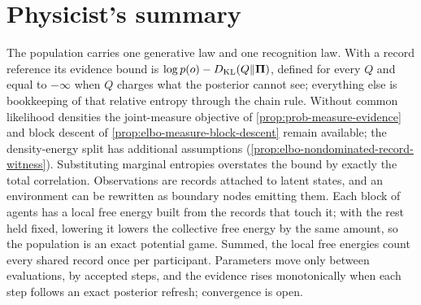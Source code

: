 \section*{Physicist's summary}

The population carries one generative law and one recognition law. With a
record reference its evidence bound is $\log p(o)-D_{\mathrm{KL}}(Q\Vert\boldsymbol\Pi)$, defined for every
$Q$ and equal to $-\infty$ when $Q$ charges what the posterior cannot see;
everything else is bookkeeping of that relative entropy through the chain rule.
Without common likelihood densities the joint-measure objective of
\cref{prop:prob-measure-evidence} and block descent of
\cref{prop:elbo-measure-block-descent} remain available; the density-energy
split has additional assumptions
(\cref{prop:elbo-nondominated-record-witness}).
Substituting marginal entropies overstates the bound by exactly the total
correlation. Observations are records attached to latent states, and an
environment can be rewritten as boundary nodes emitting them. Each block of
agents has a local free energy built from the records that touch it; with the
rest held fixed, lowering it lowers the collective free energy by the same
amount, so the population is an exact potential game. Summed, the local free
energies count every shared record once per participant. Parameters move only
between evaluations, by accepted steps, and the evidence rises monotonically
when each step follows an exact posterior refresh; convergence is open.
